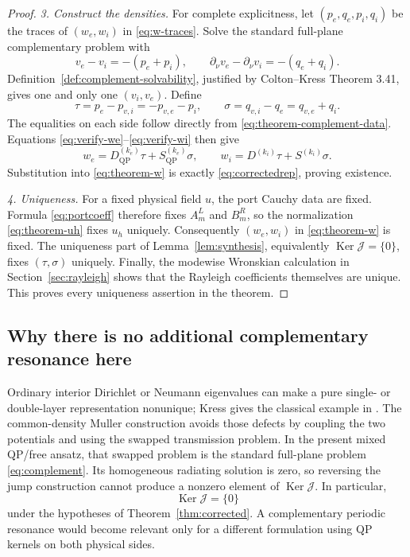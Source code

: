 \documentclass[11pt]{article}
\newcommand{\QP}{\mathrm{QP}}
\newcommand{\Ker}{\operatorname{Ker}}
\theoremstyle{plain}
\theoremstyle{definition}
\theoremstyle{remark}
\begin{document}
\begin{proof}
\emph{3. Construct the densities.}
For complete explicitness, let \((p_e,q_e,p_i,q_i)\) be the traces of
\((w_e,w_i)\) in \eqref{eq:w-traces}.  Solve the standard full-plane
complementary problem with
\begin{equation}
v_e-v_i=-(p_e+p_i),\qquad
\partial_\nu v_e-\partial_\nu v_i=-(q_e+q_i).
\label{eq:theorem-complement-data}
\end{equation}
Definition~\ref{def:complement-solvability}, justified by Colton--Kress
Theorem 3.41, gives one and only one \((v_i,v_e)\).  Define
\begin{equation}
\tau=p_e-p_{v,i}=-p_{v,e}-p_i,\qquad
\sigma=q_{v,i}-q_e=q_{v,e}+q_i.
\label{eq:theorem-densities}
\end{equation}
The equalities on each side follow directly from
\eqref{eq:theorem-complement-data}.  Equations
\eqref{eq:verify-we}--\eqref{eq:verify-wi} then give
\[
w_e=D_{\QP}^{(k_e)}\tau+S_{\QP}^{(k_e)}\sigma,
\qquad
w_i=D^{(k_i)}\tau+S^{(k_i)}\sigma.
\]
Substitution into \eqref{eq:theorem-w} is exactly
\eqref{eq:correctedrep}, proving existence.

\emph{4. Uniqueness.}
For a fixed physical field \(u\), the port Cauchy data are fixed.
Formula \eqref{eq:portcoeff} therefore fixes \(A_m^L\) and \(B_m^R\), so the
normalization \eqref{eq:theorem-uh} fixes \(u_h\) uniquely.  Consequently
\((w_e,w_i)\) in \eqref{eq:theorem-w} is fixed.  The uniqueness part of
Lemma~\ref{lem:synthesis}, equivalently \(\Ker\mathcal J=\{0\}\), fixes
\((\tau,\sigma)\) uniquely.  Finally, the modewise Wronskian calculation in
Section~\ref{sec:rayleigh} shows that the Rayleigh coefficients themselves are
unique.  This proves every uniqueness assertion in the theorem.
\end{proof}

\subsection{Why there is no additional complementary resonance here}

Ordinary interior Dirichlet or Neumann eigenvalues can make a pure single- or
double-layer representation nonunique; Kress gives the classical example in
\cite[Section 1]{Kress1991}.  The common-density Muller construction avoids
those defects by coupling the two potentials and using the swapped transmission
problem.  In the present mixed QP/free ansatz, that swapped problem is the
standard full-plane problem \eqref{eq:complement}.  Its homogeneous radiating
solution is zero, so reversing the jump construction cannot produce a nonzero
element of \(\Ker\mathcal J\).  In particular,
\[
\Ker\mathcal J=\{0\}
\]
under the hypotheses of Theorem~\ref{thm:corrected}.  A complementary periodic
resonance would become relevant only for a different formulation using QP
kernels on both physical sides.
\end{document}
